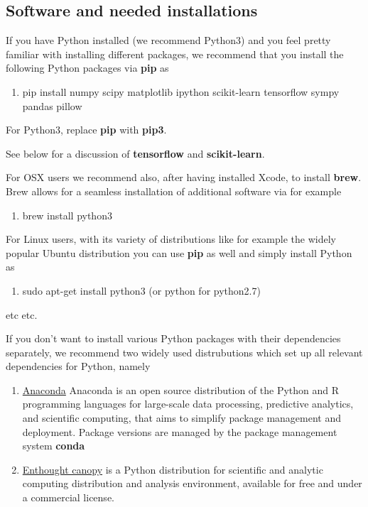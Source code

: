 \documentclass[%
oneside,                 %
final,                   %
10pt]{article}
\begin{document}
\noindent
\subsection{Software and needed installations}

If you have Python installed (we recommend Python3) and you feel pretty familiar with installing different packages, 
we recommend that you install the following Python packages via \textbf{pip} as
\begin{enumerate}
\item pip install numpy scipy matplotlib ipython scikit-learn tensorflow sympy pandas pillow
\end{enumerate}

\noindent
For Python3, replace \textbf{pip} with \textbf{pip3}.

See below for a discussion of \textbf{tensorflow} and \textbf{scikit-learn}. 

For OSX users we recommend also, after having installed Xcode, to install \textbf{brew}. Brew allows 
for a seamless installation of additional software via for example
\begin{enumerate}
\item brew install python3
\end{enumerate}

\noindent
For Linux users, with its variety of distributions like for example the widely popular Ubuntu distribution
you can use \textbf{pip} as well and simply install Python as 
\begin{enumerate}
\item sudo apt-get install python3  (or python for python2.7)
\end{enumerate}

\noindent
etc etc. 

If you don't want to install various Python packages with their dependencies separately, we recommend two widely used distrubutions which set up  all relevant dependencies for Python, namely
\begin{enumerate}
\item \href{{https://docs.anaconda.com/}}{Anaconda} Anaconda is an open source distribution of the Python and R programming languages for large-scale data processing, predictive analytics, and scientific computing, that aims to simplify package management and deployment. Package versions are managed by the package management system \textbf{conda}

\item \href{{https://www.enthought.com/product/canopy/}}{Enthought canopy}  is a Python distribution for scientific and analytic computing distribution and analysis environment, available for free and under a commercial license.
\end{enumerate}
\end{document}
